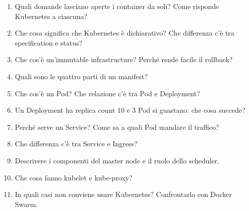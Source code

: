 \begin{domande}
\begin{enumerate}
  \item Quali domande lasciano aperte i container da soli? Come risponde Kubernetes a ciascuna?
  \item Che cosa significa che Kubernetes è dichiarativo? Che differenza c'è tra specification e status?
  \item Che cos'è un'immutable infrastructure? Perché rende facile il rollback?
  \item Quali sono le quattro parti di un manifest?
  \item Che cos'è un Pod? Che relazione c'è tra Pod e Deployment?
  \item Un Deployment ha replica count 10 e 3 Pod si guastano: che cosa succede?
  \item Perché serve un Service? Come sa a quali Pod mandare il traffico?
  \item Che differenza c'è tra Service e Ingress?
  \item Descrivere i componenti del master node e il ruolo dello scheduler.
  \item Che cosa fanno kubelet e kube-proxy?
  \item In quali casi non conviene usare Kubernetes? Confrontarlo con Docker Swarm.
\end{enumerate}
\end{domande}
